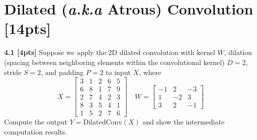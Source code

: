 \documentclass{article}
\begin{document}
\section{Dilated (\textit{a.k.a} Atrous) Convolution [14pts]}
\noindent
\textbf{4.1 [4pts]} Suppose we apply the 2D dilated convolution with kernel $W$, dilation (spacing between neighboring elements within the convolutional kernel) $D = 2$, stride $S = 2$, and padding $P = 2$ to input $X$, where
\begin{equation}
    X= 
    \begin{bmatrix}
        3&1&2&6&5\\
        6&8&1&7&9\\
        2&7&4&2&3\\
        8&3&5&4&1\\
        1&5&2&7&6
    \end{bmatrix}
    \quad W=
    \begin{bmatrix}
        -1&2&-3\\
        1&-2&3\\
        3&2&-1
    \end{bmatrix}
\end{equation}
Compute the output $Y = \text{DilatedConv}(X)$ and show the intermediate computation results.\\
\end{document}
